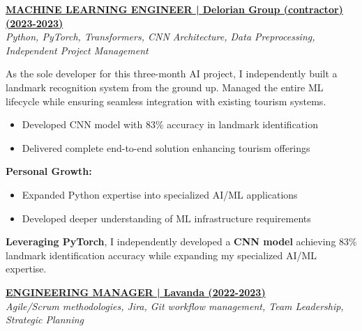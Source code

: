 \documentclass[a4paper,10pt]{article}
\begin{document}
{\begin{minipage}{\dimexpr\textwidth-2\fboxsep\relax}
		\vspace{0.4cm}

        \noindent\uline{\textbf{MACHINE LEARNING ENGINEER | Delorian Group (contractor) (2023-2023)}} \\
		\vspace{0.1cm}
		{\small\textit{Python, PyTorch, Transformers, CNN Architecture, Data Preprocessing, Independent Project Management}}
		\vspace{0.2cm}

		As the sole developer for this three-month AI project, I independently built a landmark recognition system from the ground up. Managed the entire ML lifecycle while ensuring seamless integration with existing tourism systems.

		\vspace{0.2cm}
		\begin{itemize}[label=\textcolor{darkblue}{\textbullet}, leftmargin=*, nosep]
			\item Developed CNN model with 83\% accuracy in landmark identification
			\item Delivered complete end-to-end solution enhancing tourism offerings
		\end{itemize}

		\vspace{0.2cm}
		\textbf{Personal Growth:}
		\vspace{0.2cm}
		\begin{itemize}[label=\textcolor{darkblue}{\textbullet}, leftmargin=*, nosep]
			\item Expanded Python expertise into specialized AI/ML applications
			\item Developed deeper understanding of ML infrastructure requirements
		\end{itemize}

		\vspace{0.4cm}

        \textbf{Leveraging PyTorch}, I independently developed a \textbf{CNN model} achieving 83\% landmark identification accuracy while expanding my specialized AI/ML expertise.

		\vspace{0.4cm}

        \noindent\uline{\textbf{ENGINEERING MANAGER | Lavanda (2022-2023)}} \\
		\vspace{0.1cm}
		{\small\textit{Agile/Scrum methodologies, Jira, Git workflow management, Team Leadership, Strategic Planning}}
		\vspace{0.2cm}


\end{minipage}}
\end{document}

